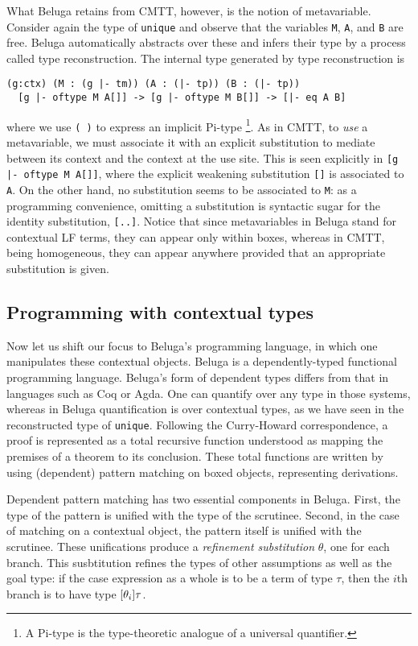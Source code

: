 What Beluga retains from CMTT, however, is the notion of metavariable.
Consider again the type of \lstinline!unique! and observe that the variables
\lstinline!M!, \lstinline!A!, and \lstinline!B! are free.
Beluga automatically abstracts over these and infers their type by a process
called type reconstruction.
The internal type generated by type reconstruction is
\begin{lstlisting}[gobble=2]
  (g:ctx) (M : (g |- tm)) (A : (|- tp)) (B : (|- tp))
  [g |- oftype M A[]] -> [g |- oftype M B[]] -> [|- eq A B]
\end{lstlisting}
where we use \lstinline!( )! to express an implicit Pi-type
\footnote{%
  A Pi-type is the type-theoretic analogue of a universal quantifier.
}.
As in CMTT, to \emph{use} a metavariable, we must associate it with an explicit
substitution to mediate between its context and the context at the use site.
This is seen explicitly in \lstinline![g |- oftype M A[]]!, where the explicit
weakening substitution \lstinline![]! is associated to \lstinline!A!.
On the other hand, no substitution seems to be associated to \lstinline!M!:
as a programming convenience, omitting a substitution is syntactic sugar for the
identity substitution, \lstinline![..]!.
Notice that since metavariables in Beluga stand for contextual LF terms, they
can appear only within boxes, whereas in CMTT, being homogeneous, they can
appear anywhere provided that an appropriate substitution is given.

\subsection{Programming with contextual types}

Now let us shift our focus to Beluga's programming language, in which one
manipulates these contextual objects.
Beluga is a dependently-typed functional programming language.
Beluga's form of dependent types differs from that in languages such as Coq or
Agda.
One can quantify over any type in those systems, whereas in Beluga
quantification is over contextual types, as we have seen in the reconstructed
type of \lstinline!unique!.
Following the Curry-Howard correspondence, a proof is represented as a total
recursive function understood as mapping the premises of a theorem to its
conclusion.
These total functions are written by using (dependent) pattern matching on boxed
objects, representing derivations.

Dependent pattern matching has two essential components in Beluga.
First, the type of the pattern is unified with the type of the scrutinee.
Second, in the case of matching on a contextual object, the pattern itself is
unified with the scrutinee.
These unifications produce a \emph{refinement substitution} $\theta$, one for
each branch.
This susbtitution refines the types of other assumptions as well as the goal
type: if the case expression as a whole is to be a term of type $\tau$, then
the $i$th branch is to have type $[\theta_i]\tau$.

